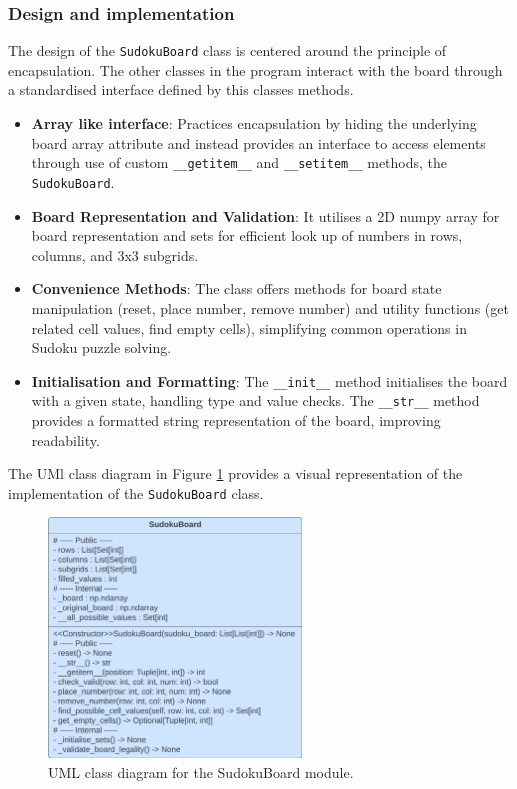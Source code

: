 \documentclass[11pt]{article}
\begin{document}
\subsubsection{Design and implementation}
The design of the \texttt{SudokuBoard} class is centered around the principle of encapsulation. The other classes in the program interact with the board through a standardised interface defined by this classes methods. 
\begin{itemize}
    \item \textbf{Array like interface}: Practices encapsulation by hiding the underlying board array attribute and instead provides an interface to access elements through use of custom
    \texttt{\_\_getitem\_\_} and \texttt{\_\_setitem\_\_} methods, the \texttt{SudokuBoard}.
    \item \textbf{Board Representation and Validation}: It utilises a 2D numpy array for board representation and sets for efficient look up of numbers in rows, columns, and 3x3 subgrids. 

    \item \textbf{Convenience Methods}: The class offers methods for board state manipulation (reset, place number, remove number) and utility functions (get related cell values, find empty cells), simplifying common operations in Sudoku puzzle solving.
    
    \item \textbf{Initialisation and Formatting}: The \texttt{\_\_init\_\_} method initialises the board with a given state, handling type and value checks. The \texttt{\_\_str\_\_} method provides a formatted string representation of the board, improving readability.

\end{itemize}

The UMl class diagram in Figure \ref{fig:sudoku_board_uml} provides a visual representation of the implementation of the \texttt{SudokuBoard} class.

\begin{figure}[H]
    \centering
    \includegraphics[width=0.6\textwidth]{figs/UML_sudoku_board.png}
    \caption{UML class diagram for the SudokuBoard module.}
    \label{fig:sudoku_board_uml}
\end{figure}
 
\end{document}
